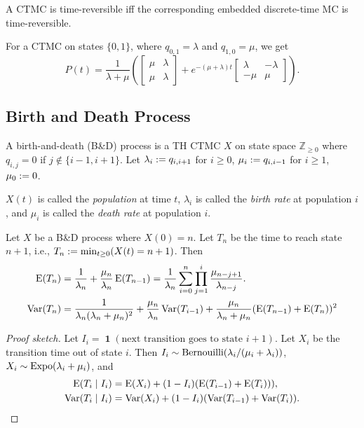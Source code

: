 \documentclass[a4paper, 12pt, fleqn]{article}
\DeclareMathOperator{\boolone}{\mathbf{1}}
\DeclareMathOperator{\Expo}{\opname{Expo}}
\begin{document}
\begin{definition}
A CTMC is time-reversible iff the corresponding embedded discrete-time MC is time-reversible.
\end{definition}

\begin{lemma}[2-state]
For a CTMC on states $\{0, 1\}$, where $q_{0,1} = \lambda$ and $q_{1,0} = \mu$, we get
\[ P(t) = \frac{1}{\lambda + \mu}\left(
\begin{bmatrix}\mu & \lambda \\ \mu & \lambda\end{bmatrix}
+ e^{-(\mu+\lambda)t}\begin{bmatrix}\lambda & -\lambda \\ -\mu & \mu\end{bmatrix}
\right). \]
\end{lemma}

\subsection{Birth and Death Process}

\begin{definition}
A birth-and-death (B\&D) process is a TH CTMC $X$ on state space $\mathbb{Z}_{\ge 0}$ where
$q_{i,j} = 0$ if $j \not\in \{i-1, i+1\}$. Let $\lambda_i := q_{i,i+1}$ for $i \ge 0$,
$\mu_i := q_{i,i-1}$ for $i \ge 1$, $\mu_0 := 0$.

$X(t)$ is called the \emph{population} at time $t$,
$\lambda_i$ is called the \emph{birth rate} at population $i$,
and $\mu_i$ is called the \emph{death rate} at population $i$.
\end{definition}

\begin{lemma}
Let $X$ be a B\&D process where $X(0)=n$.
Let $T_n$ be the time to reach state $n+1$, i.e., $T_n := \min_{t \ge 0} (X(t) = n+1)$. Then
\begin{align*}
\operatorname*{E}(T_n) &= \frac{1}{\lambda_n} + \frac{\mu_n}{\lambda_n}\operatorname*{E}(T_{n-1})
= \frac{1}{\lambda_n}\sum_{i=0}^n \prod_{j=1}^i \frac{\mu_{n-j+1}}{\lambda_{n-j}}.
\\ \operatorname*{Var}(T_n) &= \frac{1}{\lambda_n(\lambda_n + \mu_n)^2} + \frac{\mu_n}{\lambda_n}\operatorname*{Var}(T_{i-1})
    + \frac{\mu_n}{\lambda_n + \mu_n}(\operatorname*{E}(T_{n-1}) + \operatorname*{E}(T_n))^2
\end{align*}
\end{lemma}
\begin{proof}[Proof sketch]
Let $I_i = \boolone(\textrm{next transition goes to state } i+1)$.
Let $X_i$ be the transition time out of state $i$.
Then $I_i \sim \operatorname{Bernouilli}(\lambda_i/(\mu_i + \lambda_i))$,
$X_i \sim \Expo(\lambda_i + \mu_i)$, and
\begin{align*}
\operatorname*{E}(T_i \mid I_i) &= \operatorname*{E}(X_i) + (1-I_i)(\operatorname*{E}(T_{i-1}) + \operatorname*{E}(T_i))),
\\ \operatorname*{Var}(T_i \mid I_i) &= \operatorname*{Var}(X_i) + (1-I_i)(\operatorname*{Var}(T_{i-1}) + \operatorname*{Var}(T_i)).
\qedhere \end{align*}
\end{proof}
\end{document}
